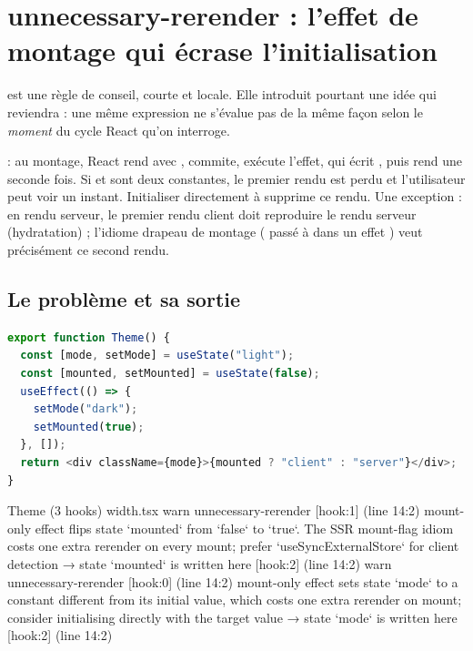 \section{unnecessary-rerender : l'effet de montage qui écrase l'initialisation}
\label{sec:regles-effets-unnecessary-rerender}

 est une règle de conseil, courte et locale. Elle introduit pourtant une idée qui reviendra : une même expression ne s'évalue pas de la même façon selon le \emph{moment} du cycle React qu'on interroge.

\begin{react}
 : au montage, React rend avec , commite, exécute l'effet, qui écrit , puis rend une seconde fois. Si  et  sont deux constantes, le premier rendu est perdu et l'utilisateur peut voir  un instant. Initialiser directement à  supprime ce rendu. Une exception : en rendu serveur, le premier rendu client doit reproduire le rendu serveur (hydratation) ; l'idiome \og drapeau de montage\fg{} ( passé à  dans un effet \code{[]}) veut précisément ce second rendu.
\end{react}

\subsection{Le problème et sa sortie}

\begin{lstlisting}[language=TypeScript,caption={\file{/tmp/ch20/width.tsx}, composant \code{Theme} : deux écritures de montage},label={lst:regles-effets-theme}]
export function Theme() {
  const [mode, setMode] = useState("light");
  const [mounted, setMounted] = useState(false);
  useEffect(() => {
    setMode("dark");
    setMounted(true);
  }, []);
  return <div className={mode}>{mounted ? "client" : "server"}</div>;
}
\end{lstlisting}

\begin{sortie}
  Theme  (3 hooks)  width.tsx
    warn   unnecessary-rerender  [hook:1]  (line 14:2)  mount-only effect flips state `mounted` from `false` to `true`. The SSR mount-flag idiom costs one extra rerender on every mount; prefer `useSyncExternalStore` for client detection
       → state `mounted` is written here [hook:2] (line 14:2)
    warn   unnecessary-rerender  [hook:0]  (line 14:2)  mount-only effect sets state `mode` to a constant different from its initial value, which costs one extra rerender on mount; consider initialising directly with the target value
       → state `mode` is written here [hook:2] (line 14:2)
\end{sortie}

